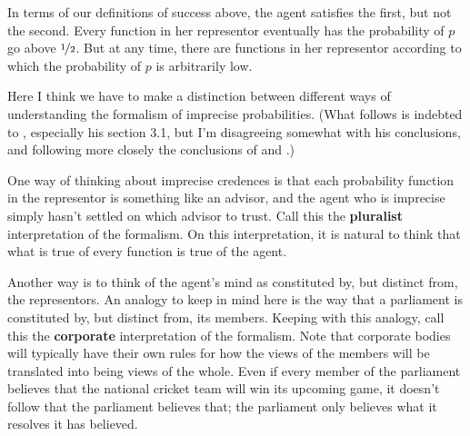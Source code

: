 In terms of our definitions of success above, the agent satisfies the first, but not the second. Every function in her representor eventually has the probability of $p$ go above $\nicefrac{1}{2}$. But at any time, there are functions in her representor according to which the probability of $p$ is arbitrarily low. 

Here I think we have to make a distinction between different ways of understanding the formalism of imprecise probabilities. (What follows is indebted to \citet{Bradley2014}, especially his section 3.1, but I'm disagreeing somewhat with his conclusions, and following more closely the conclusions of \citet{Joyce2010} and \citet{Schoenfield2012}.) 

One way of thinking about imprecise credences is that each probability function in the representor is something like an advisor, and the agent who is imprecise simply hasn't settled on which advisor to trust. Call this the \textbf{pluralist} interpretation of the formalism. On this interpretation, it is natural to think that what is true of every function is true of the agent.

Another way is to think of the agent's mind as constituted by, but distinct from, the representors. An analogy to keep in mind here is the way that a parliament is constituted by, but distinct from, its members. Keeping with this analogy, call this the \textbf{corporate} interpretation of the formalism. Note that corporate bodies will typically have their own rules for how the views of the members will be translated into being views of the whole. Even if every member of the parliament believes that the national cricket team will win its upcoming game, it doesn't follow that the parliament believes that; the parliament only believes what it resolves it has believed.

